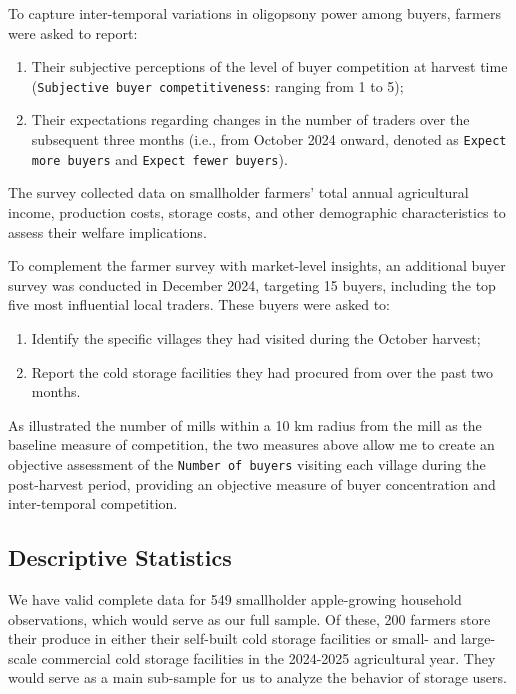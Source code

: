 \documentclass[12pt]{article}
\begin{document}
To capture inter-temporal variations in oligopsony power among buyers, farmers were asked to report:
\begin{enumerate}
    \item Their subjective perceptions of the level of buyer competition at harvest time (\texttt{Subjective buyer competitiveness}: ranging from 1 to 5);
    \item Their expectations regarding changes in the number of traders over the subsequent three months (i.e., from October 2024 onward, denoted as \texttt{Expect more buyers} and \texttt{Expect fewer buyers}).
\end{enumerate}

The survey collected data on smallholder farmers' total annual agricultural income, production costs, storage costs, and other demographic characteristics to assess their welfare implications.

To complement the farmer survey with market-level insights, an additional buyer survey was conducted in December 2024, targeting 15 buyers, including the top five most influential local traders. These buyers were asked to:
\begin{enumerate}
    \item Identify the specific villages they had visited during the October harvest;
    \item Report the cold storage facilities they had procured from over the past two months.
\end{enumerate}
As \cite{macchiavello2021competition} illustrated the number of mills within a 10 km radius from the mill as the baseline measure of competition, the two measures above allow me to create an objective assessment of the \texttt{Number of buyers} visiting each village during the post-harvest period, providing an objective measure of buyer concentration and inter-temporal competition.

\subsection{Descriptive Statistics}
\noindent We have valid complete data for 549 smallholder apple-growing household observations, which would serve as our full sample. Of these, 200 farmers store their produce in either their self-built cold storage facilities or small- and large-scale commercial cold storage facilities in the 2024-2025 agricultural year. They would serve as a main sub-sample for us to analyze the behavior of storage users. 
\end{document}
